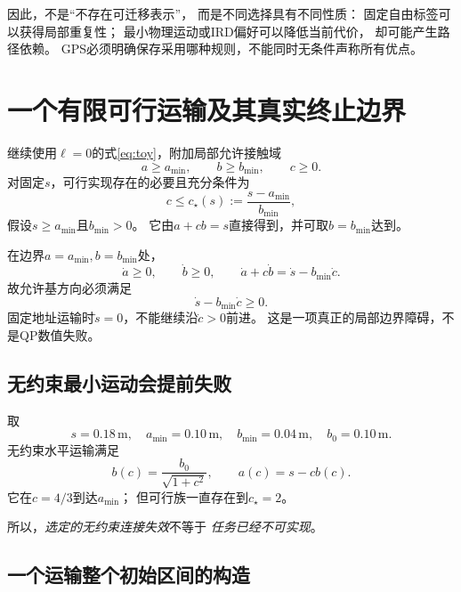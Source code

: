 \documentclass[UTF8,11pt,a4paper,fontset=fandol]{ctexart}
\numberwithin{equation}{section}
\theoremstyle{definition}
\begin{document}
因此，不是``不存在可迁移表示''，
而是不同选择具有不同性质：
固定自由标签可以获得局部重复性；
最小物理运动或IRD偏好可以降低当前代价，
却可能产生路径依赖。
GPS必须明确保存采用哪种规则，不能同时无条件声称所有优点。

\section{一个有限可行运输及其真实终止边界}

继续使用$\ell=0$的式\eqref{eq:toy}，附加局部允许接触域
\begin{equation}
 a\geq a_{\min},\qquad b\geq b_{\min},\qquad c\geq0.
\end{equation}
对固定$s$，可行实现存在的必要且充分条件为
\begin{equation}
 \boxed{
 c\leq c_\star(s):=\frac{s-a_{\min}}{b_{\min}},
 }
 \label{eq:critical}
\end{equation}
假设$s\geq a_{\min}$且$b_{\min}>0$。
它由$a+cb=s$直接得到，并可取$b=b_{\min}$达到。

在边界$a=a_{\min},b=b_{\min}$处，
\begin{equation}
 \dot a\geq0,\qquad \dot b\geq0,\qquad
 \dot a+c\dot b=\dot s-b_{\min}\dot c.
\end{equation}
故允许基方向必须满足
\begin{equation}
 \boxed{\dot s-b_{\min}\dot c\geq0.}
 \label{eq:toycone}
\end{equation}
固定地址运输时$\dot s=0$，不能继续沿$\dot c>0$前进。
这是一项真正的局部边界障碍，不是QP数值失败。

\subsection{无约束最小运动会提前失败}

取
\begin{equation}
 s=0.18\,\mathrm m,\quad
 a_{\min}=0.10\,\mathrm m,\quad
 b_{\min}=0.04\,\mathrm m,\quad
 b_0=0.10\,\mathrm m.
\end{equation}
无约束水平运输满足
\begin{equation}
 b(c)=\frac{b_0}{\sqrt{1+c^2}},\qquad
 a(c)=s-cb(c).
\end{equation}
它在$c=4/3$到达$a_{\min}$；
但可行族一直存在到$c_\star=2$。

所以，\emph{选定的无约束连接失效}不等于
\emph{任务已经不可实现}。

\subsection{一个运输整个初始区间的构造}
\end{document}
